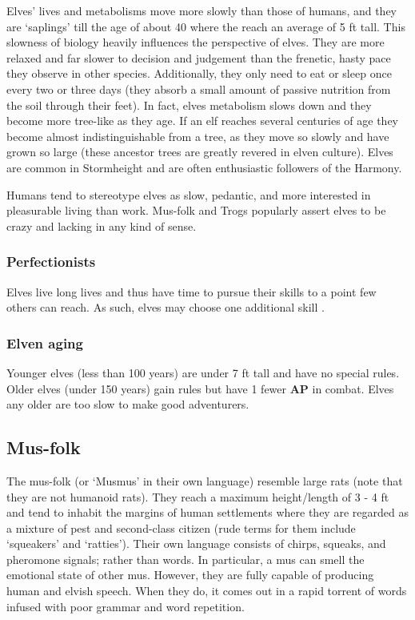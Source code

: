 \documentclass[a4paper,11pt,oneside]{book}
\newcommand{\textlf}[1]{\textbf{\titlecap{#1}}}
\begin{document}
Elves' lives and metabolisms move more slowly than those of humans, and they are `saplings' till the age of about 40 where the reach an average of 5 ft tall. This slowness of biology heavily influences the perspective of elves. They are more relaxed and far slower to decision and judgement than the frenetic, hasty pace they observe in other species. Additionally, they only need to eat or sleep once every two or three days (they absorb a small amount of passive nutrition from the soil through their feet). In fact, elves metabolism slows down and they become more tree-like as they age. If an elf reaches several centuries of age they become almost indistinguishable from a tree, as they move so slowly and have grown so large (these ancestor trees are greatly revered in elven culture). Elves are common in Stormheight and are often enthusiastic followers of the Harmony. 

Humans tend to stereotype elves as slow, pedantic, and more interested in pleasurable living than work. Mus-folk and Trogs popularly assert elves to be crazy and lacking in any kind of sense. 

\subsubsection*{Perfectionists}
Elves live long lives and thus have time to pursue their skills to a point few others can reach. As such, elves may choose one additional skill \textlf{proficiency}.

\subsubsection*{Elven aging}
Younger elves (less than 100 years) are under 7 ft tall and have no special rules. Older elves (under 150 years) gain \textlf{large creature} rules but have 1 fewer \textbf{AP} in combat. Elves any older are too slow to make good adventurers.


\subsection{Mus-folk}
The mus-folk (or `Musmus' in their own language) resemble large rats (note that they are not humanoid rats). They reach a maximum height/length of 3 - 4 ft and tend to inhabit the margins of human settlements where they are regarded as a mixture of pest and second-class citizen (rude terms for them include `squeakers' and `ratties'). Their own language consists of chirps, squeaks, and pheromone signals; rather than words. In particular, a mus can smell the emotional state of other mus. However, they are fully capable of producing human and elvish speech. When they do, it comes out in a rapid torrent of words infused with poor grammar and word repetition. 
\end{document}
